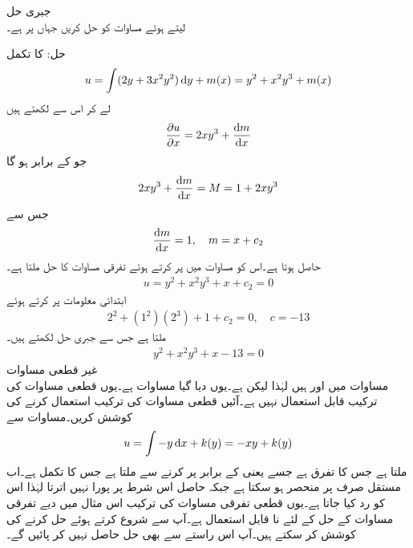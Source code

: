\quad جبری حل\\
 لیتے ہوئے مساوات  کو حل کریں  جہاں  پر  ہے۔

حل: کا  تکمل
\begin{align}\label{مساوات_سادہ_اول_قطعی_دوسرا_متغیر}
u=\int (2y+3x^2y^2)\dif y+m(x)=y^2+x^2y^3+m(x)
\end{align} 
لے کر اس سے  لکھتے ہیں
\begin{align*}
\frac{\partial u}{\partial x}=2xy^3+\frac{\dif m}{\dif x}
\end{align*}
جو  کے برابر ہو گا
\begin{align*}
2xy^3+\frac{\dif m}{\dif x}=M=1+2xy^3
\end{align*}
جس سے
\begin{align*}
\frac{\dif m}{\dif x}=1, \quad m=x+c_2
\end{align*}
حاصل ہوتا ہے۔اس کو مساوات  میں پر کرتے ہوئے تفرقی مساوات کا حل ملتا ہے۔
\begin{align*}
u=y^2+x^2y^3+x+c_2=0
\end{align*}
ابتدائی معلومات پر کرتے ہوئے
\begin{align*}
2^2+(1^2) (2^3)+1+c_2=0, \quad c=-13
\end{align*}
ملتا ہے جس سے جبری حل لکھتے ہیں۔
\begin{align*}
y^2+x^2y^3+x-13=0
\end{align*}
\quad غیر قطعی مساوات\\
مساوات  میں  اور  ہیں لہٰذا  لیکن  ہے۔یوں دیا گیا مساوات  ہے۔یوں قطعی مساوات کی ترکیب قابل استعمال نہیں ہے۔آئیں قطعی مساوات کی ترکیب استعمال کرنے کی کوشش کریں۔مساوات  سے
\begin{align*}
u=\int -y \dif x+k(y)=-xy+k(y)
\end{align*}
ملتا ہے جس کا  تفرق  ہے جسے  یعنی  کے برابر پر کرنے سے 
 ملتا ہے جس کا تکمل  ہے۔اب مستقل  صرف  پر منحصر ہو سکتا ہے جبکہ حاصل  اس شرط پر پورا نہیں اترتا لہٰذا اس کو رد کیا جاتا ہے۔یوں قطعی تفرقی مساوات کی ترکیب اس مثال میں دیے تفرقی مساوات کے حل کے لئے نا قابل استعمال ہے۔آپ  سے شروع کرتے ہوئے حل کرنے کی کوشش کر سکتے ہیں۔آپ اس راستے سے بھی حل حاصل نہیں کر پائیں گے۔

